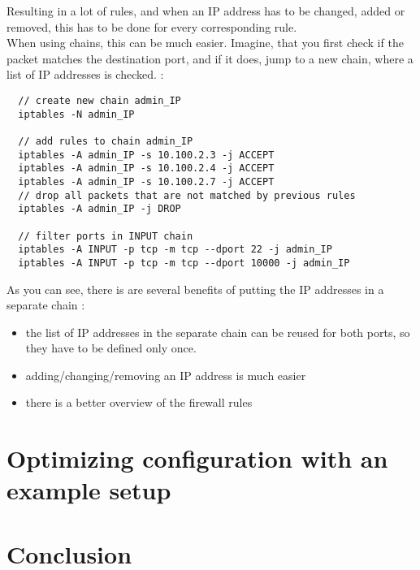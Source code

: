 \documentclass[a4paper,12pt]{article}
\begin{document}
Resulting in a lot of rules, and when an IP address has to be changed, added or removed, this has to be done for every corresponding rule.\\

When using chains, this can be much easier. Imagine, that you first check if the packet matches the destination port, and if it does, jump to a new chain, where a list of IP addresses is checked. :
\begin{verbatim}
  // create new chain admin_IP
  iptables -N admin_IP

  // add rules to chain admin_IP
  iptables -A admin_IP -s 10.100.2.3 -j ACCEPT
  iptables -A admin_IP -s 10.100.2.4 -j ACCEPT
  iptables -A admin_IP -s 10.100.2.7 -j ACCEPT
  // drop all packets that are not matched by previous rules
  iptables -A admin_IP -j DROP

  // filter ports in INPUT chain
  iptables -A INPUT -p tcp -m tcp --dport 22 -j admin_IP
  iptables -A INPUT -p tcp -m tcp --dport 10000 -j admin_IP
\end{verbatim}

As you can see, there is are several benefits of putting the IP addresses in a separate chain :
\begin{itemize}
    \item the list of IP addresses in the separate chain can be reused for both ports, so they have to be defined only once.
    \item adding/changing/removing an IP address is much easier
    \item there is a better overview of the firewall rules
\end{itemize}

\section{Optimizing configuration with an example setup}
\section{Conclusion}
\end{document}
